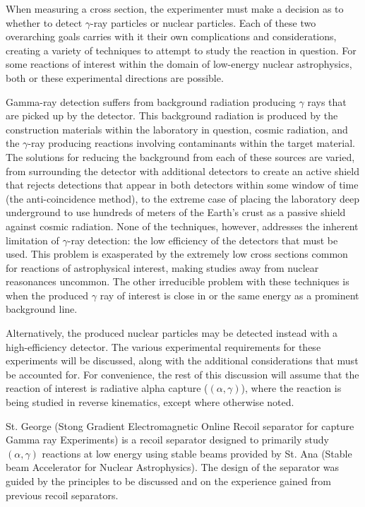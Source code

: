 When measuring a cross section, the experimenter must make a decision as to
whether to detect $\gamma$-ray particles or nuclear particles. Each of these
two overarching goals carries with it their own complications and
considerations, creating a variety of techniques to attempt to study the
reaction in question. For some reactions of interest within the domain of
low-energy nuclear astrophysics, both or these experimental directions are
possible.

Gamma-ray detection suffers from background radiation producing $\gamma$ rays
that are picked up by the detector. This background radiation is produced by
the construction materials within the laboratory in question, cosmic radiation,
and the $\gamma$-ray producing reactions involving contaminants within the
target material. The solutions for reducing the background from each of these
sources are varied, from surrounding the detector with additional detectors to
create an active shield that rejects detections that appear in both detectors
within some window of time (the anti-coincidence method), to the extreme case
of placing the laboratory deep underground to use hundreds of meters of the
Earth's crust as a passive shield against cosmic radiation. None of the
techniques, however, addresses the inherent limitation of $\gamma$-ray
detection: the low efficiency of the detectors that must be used. This problem
is exasperated by the extremely low cross sections common for reactions of
astrophysical interest, making studies away from nuclear reasonances uncommon.
The other irreducible problem with these techniques is when the produced
$\gamma$ ray of interest is close in or the same energy as a prominent
background line.

Alternatively, the produced nuclear particles may be detected instead with a
high-efficiency detector. The various experimental requirements for these
experiments will be discussed, along with the additional considerations that
must be accounted for. For convenience, the rest of this discussion will assume
that the reaction of interest is radiative alpha capture ($(\alpha,\gamma)$),
where the reaction is being studied in reverse kinematics, except where
otherwise noted.


St. George (Stong Gradient Electromagnetic Online Recoil separator for capture
Gamma ray Experiments) is a recoil separator designed to primarily study
$(\alpha,\gamma)$ reactions at low energy using stable beams provided by St.
Ana (Stable beam Accelerator for Nuclear Astrophysics). The design of the
separator was guided by the principles to be discussed and on the experience
gained from previous recoil separators.


